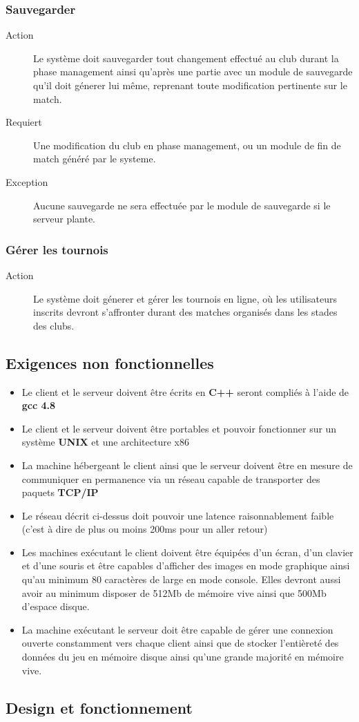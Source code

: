 \documentclass[a4paper]{article}
\begin{document}
\subsubsection{Sauvegarder}
\begin{description}
\item[Action] Le système doit sauvegarder tout changement effectué au \gls{club} durant la phase management ainsi qu'après une partie avec un module de sauvegarde qu'il doit génerer lui même, reprenant toute modification pertinente sur le match.
\item[Requiert] Une modification du \gls{club} en phase management, ou un module de fin de match généré par le systeme. 
\item[Exception] Aucune sauvegarde ne sera effectuée par le module de sauvegarde si le \gls{serveur} plante.
\end{description}

\subsubsection{Gérer les tournois}
\begin{description}
\item[Action] Le système doit génerer et gérer les tournois en ligne, où les \glspl{utilisateur} inscrits devront s'affronter durant des matches organisés dans les stades des \glspl{club}.
\end{description}


\subsection{Exigences non fonctionnelles}
\label{enf}
\begin{itemize}
\item Le \gls{client} et le \gls{serveur} doivent être écrits en \textbf{C++} seront compliés à l'aide de \textbf{gcc 4.8}
\item Le \gls{client} et le \gls{serveur} doivent être portables et pouvoir fonctionner sur un système \textbf{UNIX} et une architecture x86
\item La machine hébergeant le \gls{client} ainsi que le \gls{serveur} doivent être en mesure de communiquer en permanence via un réseau capable de transporter des paquets \textbf{TCP/IP}
\item Le réseau décrit ci-dessus doit pouvoir une latence raisonnablement faible (c'est à dire de plus ou moins 200ms pour un aller retour)
\item Les machines exécutant le \gls{client} doivent être équipées d'un écran, d'un clavier et d'une souris et être capables d'afficher des images en mode graphique ainsi qu'au minimum 80 caractères de large en mode console. Elles devront aussi avoir au minimum disposer de 512Mb de mémoire vive ainsi que 500Mb d'espace disque.
\item La machine exécutant le \gls{serveur} doit être capable de gérer une connexion ouverte constamment vers chaque \gls{client} ainsi que de stocker l'entièreté des données du jeu en mémoire disque ainsi qu'une grande majorité en mémoire vive.
\end{itemize}

\subsection{Design et fonctionnement}

\printindex
\tableofcontents
\listoffigures
\end{document}
